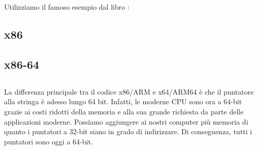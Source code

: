 \chapter{\HelloWorldSectionName}
\label{sec:helloworld}

Utilizziamo il famoso esempio dal libro \KRBook:



\section{x86}




\section{x86-64}







\section{\Conclusion{}}

La differenza principale tra il codice x86/ARM e x64/ARM64 è che il puntatore alla stringa è adesso lungo 64 bit.
Infatti, le moderne \ac{CPU} sono ora a 64-bit grazie ai costi ridotti della memoria e alla sua grande richiesta da parte delle applicazioni moderne. 
Possiamo aggiungere ai nostri computer più memoria di quanto i puntatori a 32-bit siano in grado di indirizzare.  
Di conseguenza, tutti i puntatori sono oggi a 64-bit.


